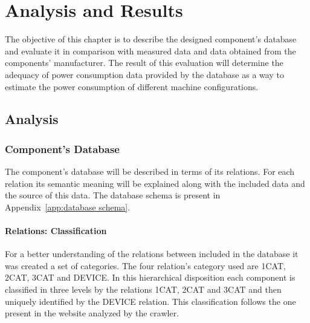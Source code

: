

\chapter{Analysis and Results} \label{chap4:analysis_results}
%
    The objective of this chapter is to describe the designed component's database and evaluate it in comparison with measured data and data obtained from the components' manufacturer. The result of this evaluation will determine the adequacy of power consumption data provided by the database as a way to estimate the power consumption of different machine configurations.
    
\section{Analysis} \label{sec4:analysis}
\subsection{Component's Database} \label{sec4:component_database}
    The component's database will be described in terms of its relations. For each relation its semantic meaning will be explained along with the included data and the source of this data. The database schema is present in Appendix~\ref{app:database schema}.

    \subsubsection*{Relations: Classification}
        For a better understanding of the relations between included in the database it was created a set of categories. The four relation's category used are 1CAT, 2CAT, 3CAT and DEVICE. In this hierarchical disposition each component is classified in three levels by the relations 1CAT, 2CAT and 3CAT and then uniquely identified by the DEVICE relation. This classification follows the one present in the website analyzed by the crawler.

